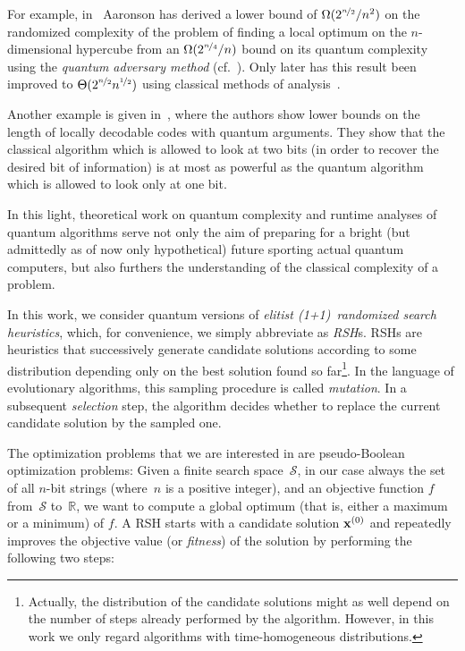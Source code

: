 \documentclass[a4paper,11pt]{article}
\begin{document}
For example, in~\cite{Aaronson06} Aaronson has derived a lower bound of $\Omega(2^{\nicefrac{n}{2}}/n^2)$ on the randomized complexity of the problem of finding a local optimum on the $n$-dimensional hypercube from an $\Omega(2^{\nicefrac{n}{4}}/n)$ bound on its quantum complexity using the \emph{quantum adversary method} (cf.~\cite{Ambainis08}). Only later has this result been improved to $\Theta(2^{\nicefrac{n}{2}}n^{\nicefrac{1}{2}})$ using classical methods of analysis~\cite{Zhang06}.

Another example is given in~\cite{KerenidisW04}, where the authors show lower bounds on the length of locally decodable codes with quantum arguments. They show that the classical algorithm which is allowed to look at two bits (in order to recover the desired bit of information) is at most as powerful as the quantum algorithm which is allowed to look only at one bit.

In this light, theoretical work on quantum complexity and runtime analyses of quantum algorithms serve not only the aim of preparing for a bright (but admittedly as of now only hypothetical) future sporting actual quantum computers, but also furthers the understanding of the classical complexity of a problem.

In this work, we consider quantum versions of \emph{elitist (1+1)~randomized search heuristics}, which, for convenience, we simply abbreviate as \emph{RSH}s. RSHs are heuristics that successively generate candidate solutions according to some distribution depending only on the best solution found so far\footnote{Actually, the distribution of the candidate solutions might as well depend on the number of steps already performed by the algorithm. However, in this work we only regard algorithms with time-homogeneous distributions.}. In the language of evolutionary algorithms, this sampling procedure is called \emph{mutation}. In a subsequent \emph{selection} step, the algorithm decides whether to replace the current candidate solution by the sampled one. 

The optimization problems that we are interested in are pseudo-Boolean optimization problems: Given a finite search space~$\mathcal{S}$, in our case always the set of all $n$-bit strings (where~$n$ is a positive integer), and an objective function $f$ from~$\mathcal{S}$ to~$\mathbb{R}$, we want to compute a global optimum (that is, either a maximum or a minimum) of $f$. A RSH starts with a candidate solution $\xvec[0]$ and repeatedly improves the objective value (or \emph{fitness}) of the solution by performing the following two steps:
\end{document}
